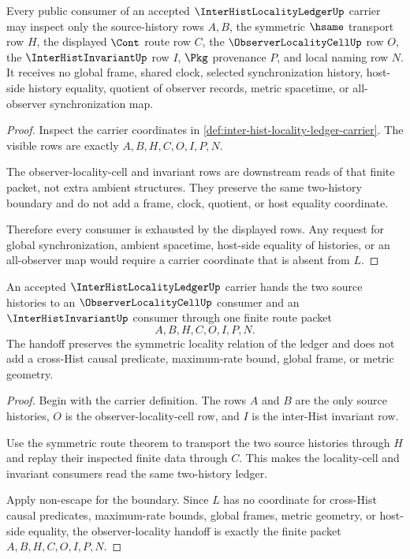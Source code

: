 \begin{theorem}
\label{thm:inter-hist-locality-ledger-nonescape}
Every public consumer of an accepted $\InterHistLocalityLedgerUp$ carrier may inspect only the source-history rows $A,B$, the symmetric $\hsame$ transport row $H$, the displayed $\Cont$ route row $C$, the $\ObserverLocalityCellUp$ row $O$, the $\InterHistInvariantUp$ row $I$, $\Pkg$ provenance $P$, and local naming row $N$. It receives no global frame, shared clock, selected synchronization history, host-side history equality, quotient of observer records, metric spacetime, or all-observer synchronization map.
\end{theorem}
\begin{proof}
Inspect the carrier coordinates in \autoref{def:inter-hist-locality-ledger-carrier}. The visible rows are exactly $A,B,H,C,O,I,P,N$.

The observer-locality-cell and invariant rows are downstream reads of that finite packet, not extra ambient structures. They preserve the same two-history boundary and do not add a frame, clock, quotient, or host equality coordinate.

Therefore every consumer is exhausted by the displayed rows. Any request for global synchronization, ambient spacetime, host-side equality of histories, or an all-observer map would require a carrier coordinate that is absent from $L$.
\end{proof}

\begin{theorem}
\label{thm:inter-hist-locality-ledger-observer-locality-handoff}
An accepted $\InterHistLocalityLedgerUp$ carrier hands the two source histories to an $\ObserverLocalityCellUp$ consumer and an $\InterHistInvariantUp$ consumer through one finite route packet
$$
A,B,H,C,O,I,P,N.
$$
The handoff preserves the symmetric locality relation of the ledger and does not add a cross-Hist causal predicate, maximum-rate bound, global frame, or metric geometry.
\end{theorem}
\begin{proof}
Begin with the carrier definition. The rows $A$ and $B$ are the only source histories, $O$ is the observer-locality-cell row, and $I$ is the inter-Hist invariant row.

Use the symmetric route theorem to transport the two source histories through $H$ and replay their inspected finite data through $C$. This makes the locality-cell and invariant consumers read the same two-history ledger.

Apply non-escape for the boundary. Since $L$ has no coordinate for cross-Hist causal predicates, maximum-rate bounds, global frames, metric geometry, or host-side equality, the observer-locality handoff is exactly the finite packet $A,B,H,C,O,I,P,N$.
\end{proof}

